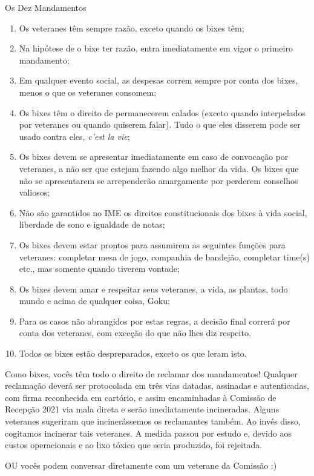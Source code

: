 \begin{editorial}{Os Dez Mandamentos}

\begin{enumerate}
  \item Os veteranes têm sempre razão, exceto quando os bixes têm;
  \item Na hipótese de o bixe ter razão, entra imediatamente em vigor
        o primeiro mandamento;
  \item Em qualquer evento social, as despesas correm sempre por conta dos
        bixes, menos o que os veteranes consomem;
  \item Os bixes têm o direito de permanecerem calados (exceto quando
        interpelados por veteranes ou quando quiserem falar). Tudo o que eles
        disserem pode ser usado contra eles, \textit{c’est la vie};
  \item Os bixes devem se apresentar imediatamente em caso de convocação por
        veteranes, a não ser que estejam fazendo algo melhor da vida. Os bixes
        que não se apresentarem se arrependerão amargamente por perderem
        conselhos valiosos; %
  \item Não são garantidos no IME os direitos constitucionais dos bixes à vida
        social, liberdade de sono e igualdade de notas;
  \item Os bixes devem estar prontos para assumirem as seguintes funções para
        veteranes: completar mesa de jogo, companhia de bandejão, completar
        time(s) etc., mas somente quando tiverem vontade;
  \item Os bixes devem amar e respeitar seus veteranes, a vida, as plantas,
        todo mundo e acima de qualquer coisa, Goku;
  \item Para os casos não abrangidos por estas regras, a decisão final correrá
        por conta dos veteranes, com exceção do que não lhes diz respeito.
  \item Todos os bixes estão despreparados, exceto os que leram isto.
\end{enumerate}

Como bixes, vocês têm todo o direito de reclamar dos mandamentos! Qualquer
reclamação deverá ser protocolada em três vias datadas, assinadas e
autenticadas, com firma reconhecida em cartório, e assim encaminhadas à
Comissão de Recepção 2021 %
via mala direta e serão imediatamente incineradas. Alguns veteranes sugeriram
que incinerássemos os reclamantes também. Ao invés disso, cogitamos incinerar
tais veteranes. A medida passou por estudo e, devido aos custos operacionais e
ao lixo tóxico que seria produzido, foi rejeitada.

OU vocês podem conversar diretamente com um veterane da Comissão :)

\end{editorial}
